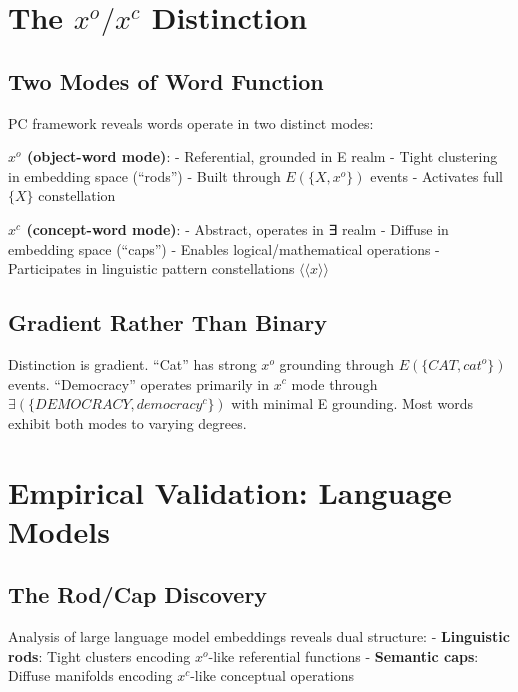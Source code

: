 \documentclass[12pt]{article}
\begin{document}
\section{\texorpdfstring{The \(x^o/x^c\) Distinction}{The x\^{}o/x\^{}c Distinction}}\label{the-xoxc-distinction}

\subsection{Two Modes of Word Function}\label{two-modes-of-word-function}

PC framework reveals words operate in two distinct modes:

\textbf{\(x^o\) (object-word mode)}: - Referential, grounded in E realm - Tight clustering in embedding space (``rods'') - Built through \(E(\{X, x^o\})\) events - Activates full \(\{X\}\) constellation

\textbf{\(x^c\) (concept-word mode)}: - Abstract, operates in ∃ realm - Diffuse in embedding space (``caps'') - Enables logical/mathematical operations - Participates in linguistic pattern constellations \(\langle\langle x \rangle\rangle\)

\subsection{Gradient Rather Than Binary}\label{gradient-rather-than-binary}

Distinction is gradient. ``Cat'' has strong \(x^o\) grounding through \(E(\{CAT, cat^o\})\) events. ``Democracy'' operates primarily in \(x^c\) mode through \(\exists(\{DEMOCRACY, democracy^c\})\) with minimal E grounding. Most words exhibit both modes to varying degrees.

\section{Empirical Validation: Language Models}\label{empirical-validation-language-models}

\subsection{The Rod/Cap Discovery}\label{the-rodcap-discovery}

Analysis of large language model embeddings reveals dual structure: - \textbf{Linguistic rods}: Tight clusters encoding \(x^o\)-like referential functions - \textbf{Semantic caps}: Diffuse manifolds encoding \(x^c\)-like conceptual operations
\end{document}
